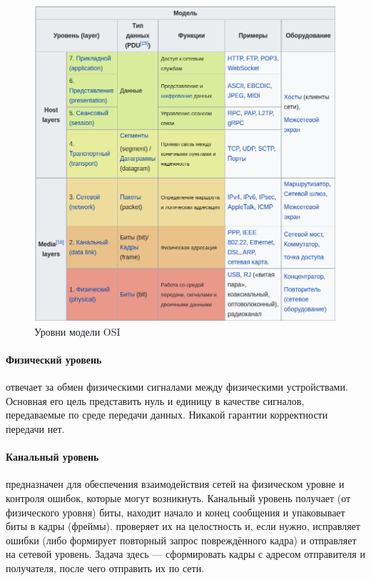 \begin{figure}[H] \centering
	\includegraphics[scale = 0.6]{17/OSI.png}
	\caption{Уровни модели OSI}
\end{figure}

\paragraph*{Физический уровень}\label{b17:osi:lev1} отвечает за обмен физическими сигналами между физическими устройствами. Основная его цель представить нуль и единицу в качестве сигналов, передаваемые по среде передачи данных. Никакой гарантии корректности передачи нет.

\paragraph*{Канальный уровень}\label{b17:osi:lev2} предназначен для обеспечения взаимодействия сетей на физическом уровне и контроля ошибок, которые могут возникнуть. Канальный уровень получает (от физического уровня) биты, находит начало и конец сообщения и упаковывает биты в кадры (фреймы). проверяет их на целостность и, если нужно, исправляет ошибки (либо формирует повторный запрос повреждённого кадра) и отправляет на сетевой уровень. Задача здесь — сформировать кадры с адресом отправителя и получателя, после чего отправить их по сети.

